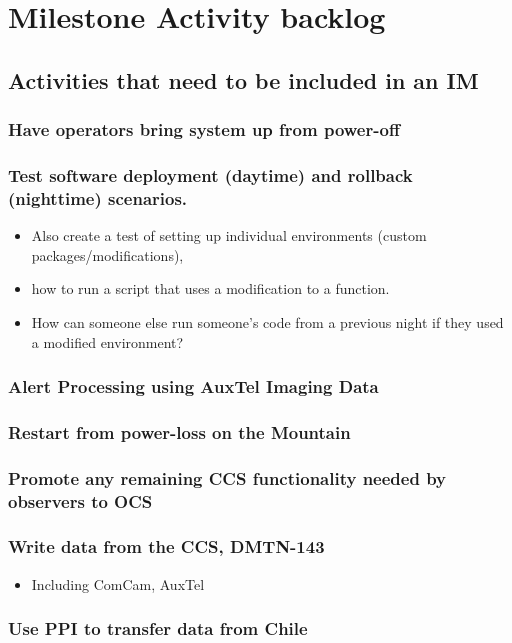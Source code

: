 \section{Milestone Activity backlog}

\subsection{Activities that need to be included in an IM}

\subsubsection{Have operators bring system up from power-off}

\subsubsection{Test software deployment (daytime) and rollback (nighttime) scenarios.}

\begin{itemize}
\item Also create a test of setting up individual environments (custom packages/modifications),
\item how to run a script that uses a modification to a function.
\item How can someone else run someone's code from a previous night if they used a modified environment?
\end{itemize}

\subsubsection{Alert Processing using AuxTel Imaging Data}

\subsubsection{Restart from power-loss on the Mountain}

\subsubsection{Promote any remaining CCS functionality needed by observers to OCS}

\subsubsection{Write data from the CCS, DMTN-143}

\begin{itemize}
\item Including ComCam, AuxTel
\end{itemize}

\subsubsection{Use PPI to transfer data from Chile}
